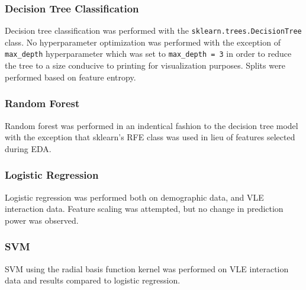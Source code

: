 \documentclass{article}
\begin{document}
\subsubsection{Decision Tree Classification}
Decision tree classification was performed with the \texttt{sklearn.trees.DecisionTree} class. No hyperparameter optimization was performed with the exception of \texttt{max\_depth} hyperparameter which was set to \texttt{max\_depth = 3} in order to reduce the tree to a size conducive to printing for visualization purposes. Splits were performed based on feature entropy.

\subsubsection{Random Forest}
Random forest was performed in an indentical fashion to the decision tree model with the exception that sklearn's RFE class was used in lieu of features selected during EDA.

\subsubsection{Logistic Regression}
Logistic regression was performed both on demographic data, and VLE interaction data. Feature scaling was attempted, but no change in prediction power was observed.

\subsubsection{SVM}
SVM using the radial basis function kernel was performed on VLE interaction data and results compared to logistic regression.
\end{document}
